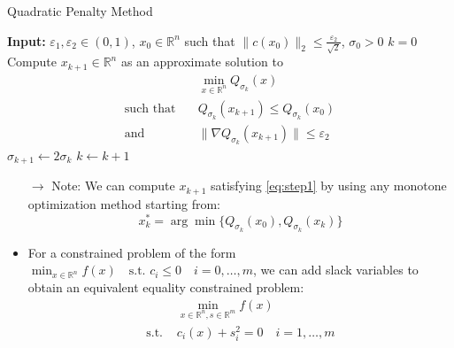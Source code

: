 \documentclass[12pt, openany]{report}
\newcommand{\R}{\mathbb{R}}
\renewcommand{\O}{\mathcal{O}}
\theoremstyle{definition}
\begin{document}
\begin{algorithm}
	\caption{Quadratic Penalty Method}
	\begin{algorithmic}[1]
		\State \textbf{Input:} $\varepsilon_1, \varepsilon_2 \in (0,1)$, $x_0 \in \R^n$ such that $\|c(x_0)\|_2 \leq \frac{\varepsilon_2}{\sqrt{2}}$, $\sigma_0 > 0$
		\State $k=0$
			\State Compute $x_{k+1} \in \R^n$ as an approximate solution to 
			\begin{equation}\label{eq:step1}
				\begin{aligned}
					&\min_{x \in \R^n} Q_{\sigma_k}(x)\\
					\text{such that} \quad &Q_{\sigma_k}(x_{k+1}) \leq Q_{\sigma_k}(x_0)\\
					\text{and} \quad &\|\nabla Q_{\sigma_k}(x_{k+1})\| \leq \varepsilon_2 
				\end{aligned}
			\end{equation}
			\State $\sigma_{k+1} \gets 2\sigma_k$
			\State $k \gets k + 1$
		\EndWhile
	\end{algorithmic}
\end{algorithm}
\begin{itemize}
	\item [$\to$] Note: We can compute $x_{k+1}$ satisfying \eqref{eq:step1} by using any monotone optimization method starting from:
	\begin{equation}
		x_k^* = \arg \min \{Q_{\sigma_k}(x_0), Q_{\sigma_k}(x_k)\}
	\end{equation}
	\item For a constrained problem of the form $\displaystyle \min_{x \in \R^n} f(x) \quad \text{s.t. } c_i \leq 0 \quad i=0, \dots, m$, we can add slack variables to obtain an equivalent equality constrained problem:
	\begin{equation}
		\begin{aligned}
			&\min_{x \in \R^n, s \in \R^m} f(x)\\
			\text{s.t. } &c_i(x) + s^2_i= 0 \quad i=1,\dots,m\\
		\end{aligned}
	\end{equation}
\end{itemize}
\end{document}
